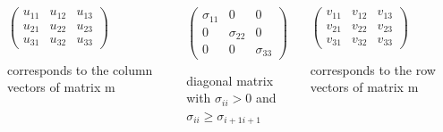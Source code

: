 \documentclass{beamer}
\begin{document}
{  \begin{block}{}
    \begin{columns}
      \begin{column}{4cm}
        \pause
        \begin{math}
          \begin{pmatrix} u_{11} & u_{12} & u_{13} \\ u_{21} & u_{22} & u_{23} \\ u_{31} & u_{32} & u_{33} \end{pmatrix}
        \end{math}
        \begin{block}{}
          corresponds to the column vectors of matrix m
          \hfill
        \end{block}
      \end{column}
      \begin{column}{4cm}
        \pause
        \begin{math}
          \begin{pmatrix} \sigma_{11} & 0 & 0 \\ 0 & \sigma_{22} & 0 \\ 0 & 0 & \sigma_{33} \end{pmatrix}
        \end{math}
        \begin{block}{}
          diagonal matrix\\ with $\sigma_{ii} > 0$ and $\sigma_{ii} \geq \sigma_{i+1 i+1}$
        \end{block}
      \end{column}
      \begin{column}{4cm}
        \pause
        \begin{math}
          \begin{pmatrix} v_{11} & v_{12} & v_{13} \\ v_{21} & v_{22} & v_{23} \\ v_{31} & v_{32} & v_{33} \end{pmatrix}
        \end{math}
        \begin{block}{}
          corresponds to the row vectors of matrix m
          \hfill
        \end{block}
      \end{column}
    \end{columns}
  \end{block}





}
\end{document}
